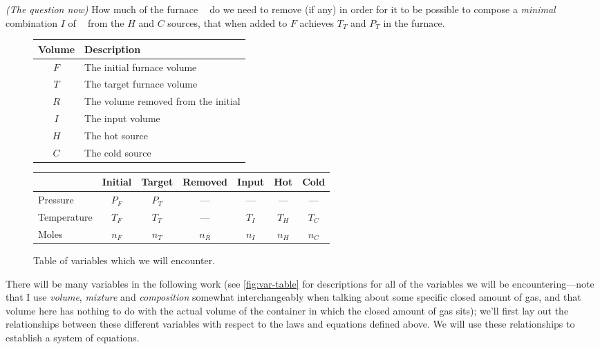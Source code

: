\documentclass{article}
\DeclareMathOperator{\CDiox}{\mathrm{CO}_2}
\begin{document}
\emph{(The question now)}
How much of the furnace $\CDiox$ do we need to remove (if any) in order for
it to be possible to compose a \emph{minimal} combination $I$ of $\CDiox$ from the $H$ and $C$
sources, that when added to $F$ achieves $T_T$ and $P_T$ in the furnace.

\begin{figure}
    \begin{center}
        \begin{tabular}{cl}
            \toprule
            Volume & Description \\
            \midrule
            $F$   & The initial furnace volume \\
            $T$   & The target furnace volume \\
            $R$   & The volume removed from the initial \\
            $I$   & The input volume \\
            $H$   & The hot source \\
            $C$   & The cold source \\
            \bottomrule
        \end{tabular}
        \vspace{1em}

        \begin{tabular}{l*6c}
            \toprule
                           & Initial & Target & Removed & Input & Hot   & Cold  \\
            \midrule                                           
            Pressure       & $P_F$   & $P_T$  & ---     & ---   & ---   & ---   \\
            Temperature    & $T_F$   & $T_T$  & ---     & $T_I$ & $T_H$ & $T_C$ \\
            Moles $\CDiox$ & $n_F$   & $n_T$  & $n_R$   & $n_I$ & $n_H$ & $n_C$ \\
            \bottomrule
        \end{tabular}
    \end{center}
    \caption{Table of variables which we will encounter.}
    \label{fig:var-table}
\end{figure}

There will be many variables in the following work (see \autoref{fig:var-table} for descriptions for
all of the variables we will be encountering---note that I use \emph{volume}, \emph{mixture} and
\emph{composition} somewhat interchangeably when talking about some specific closed amount of gas,
and that volume here has nothing to do with the actual volume of the container in which the closed
amount of gas sits); we'll first lay out the relationships between
these different variables with respect to the laws and equations defined above. We will use these
relationships to establish a system of equations.
\end{document}
